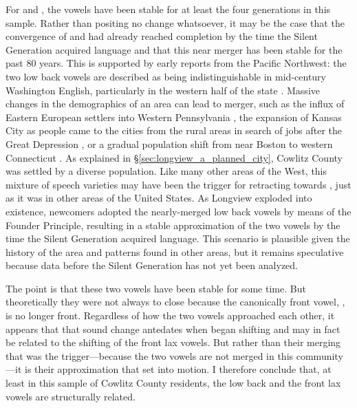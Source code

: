 For \lot and \thought, the vowels have been stable for at least the four generations in this sample. Rather than positing no change whatsoever, it may be the case that the convergence of \lot and \thought had already reached completion by the time the Silent Generation acquired language and that this near merger has been stable for the past 80 years. This is supported by early reports from the Pacific Northwest: the two low back vowels are described as being indistinguishable in mid-century Washington English, particularly in the western half of the state \citep{reed_1952}. Massive changes in the demographics of an area can lead to merger, such as the influx of Eastern European settlers into Western Pennsylvania \citep{herold_1990_diss}, the expansion of Kansas City as people came to the cities from the rural areas in search of jobs after the Great Depression \citep{strelluf_2019}, or a gradual population shift from near Boston to western Connecticut \citep{johnson_2010_pads}. As explained in \S\ref{sec:longview_a_planned_city}, Cowlitz County was settled by a diverse population. Like many other areas of the West, this mixture of speech varieties may have been the trigger for \lot retracting towards \thought, just as it was in other areas of the United States. As Longview exploded into existence, newcomers adopted the nearly-merged low back vowels by means of the Founder Principle, resulting in a stable approximation of the two vowels by the time the Silent Generation acquired language. This scenario is plausible given the history of the area and patterns found in other areas, but it remains speculative because data before the Silent Generation has not yet been analyzed.

The point is that these two vowels have been stable for some time. But theoretically they were not always to close because the canonically front vowel, \lot, is no longer front. Regardless of how the two vowels approached each other, it appears that that sound change antedates when \trap began shifting and may in fact be related to the shifting of the front lax vowels. But rather than their merging that was the trigger---because the two vowels are not merged in this community---it is their approximation that set \bat into motion. I therefore conclude that, at least in this sample of Cowlitz County residents, the low back and the front lax vowels are structurally related.

